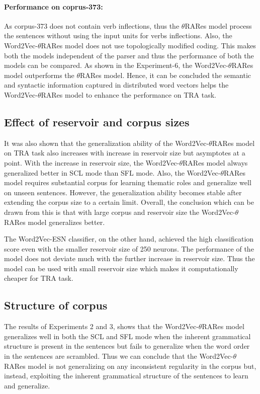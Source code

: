\paragraph{Performance on coprus-373:} As corpus-373 does not contain verb inflections, thus the $\theta$RARes model process the sentences without using the input units for verbs inflections. Also, the Word2Vec-$\theta$RARes model does not use topologically modified coding. This makes both the models independent of the parser and thus the performance of both the models can be compared. As shown in the Experiment-6, the Word2Vec-$\theta$RARes model outperforms the $\theta$RARes model. Hence, it can be concluded the semantic and syntactic information captured in distributed word vectors helps the Word2Vec-$\theta$RARes model to enhance the performance on TRA task.

\subsection{Effect of reservoir and corpus sizes}

It was also shown that the generalization ability of the Word2Vec-$\theta$RARes model on TRA task also increases with increase in reservoir size but asymptotes at a point. With the increase in reservoir size, the Word2Vec-$\theta$RARes model always generalized better in SCL mode than SFL mode. Also, the Word2Vec-$\theta$RARes model requires substantial corpus for learning thematic roles and generalize well on unseen sentences. However, the generalization ability becomes stable after extending the corpus size to a certain limit. Overall, the conclusion which can be drawn from this is that with large corpus and reservoir size the Word2Vec-$\theta$RARes model generalizes better.

The Word2Vec-ESN classifier, on the other hand, achieved the high classification score even with the smaller reservoir size of 250 neurons. The performance of the model does not deviate much with the further increase in reservoir size. Thus the model can be used with small reservoir size which makes it computationally cheaper for TRA task.

\subsection{Structure of corpus}

The results of Experiments 2 and 3, shows that the Word2Vec-$\theta$RARes model generalizes well in both the SCL and SFL mode when the inherent grammatical structure is present in the sentences but fails to generalize when the word order in the sentences are scrambled. Thus we can conclude that the Word2Vec-$\theta$RARes model is not generalizing on any inconsistent regularity in the corpus but, instead, exploiting the inherent grammatical structure of the sentences to learn and generalize.

